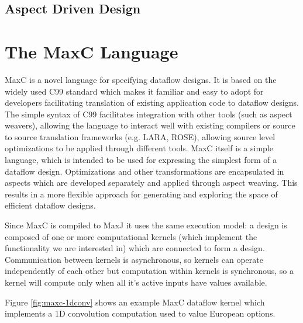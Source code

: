 \subsection{Aspect Driven Design}


\section{The  MaxC Language}

MaxC is a novel language for specifying dataflow designs. It is based
on the widely used C99 standard which makes it familiar and easy to
adopt for developers facilitating translation of existing application
code to dataflow designs. The simple syntax of C99 facilitates
integration with other tools (such as aspect weavers), allowing the
language to interact well with existing compilers or source to source
translation frameworks (e.g. LARA, ROSE), allowing source level
optimizations to be applied through different tools. MaxC itself is a
simple language, which is intended to be used for expressing the
simplest form of a dataflow design. Optimizations and other
transformations are encapsulated in aspects which are developed
separately and applied through aspect weaving. This results in a more
flexible approach for generating and exploring the space of efficient
dataflow designs.

\begin{comment}
We identify the following requirements for any dataflow language:
\begin{enumerate}
\item intuitive and easy to use
\item facilitate translation of existing applications
\item interacts well with
high-level tools
\end{enumerate}
\end{comment}

Since MaxC is compiled to MaxJ it uses the same execution model: a
design is composed of one or more computational kernels (which
implement the functionality we are interested in) which are connected
to form a design. Communication between kernels is asynchronous, so
kernels can operate independently of each other but computation within
kernels is synchronous, so a kernel will compute only when all it's
active inputs have values available.

Figure \ref{fig:maxc-1dconv} shows an example MaxC dataflow kernel
which implements a 1D convolution computation used to value European
options.


